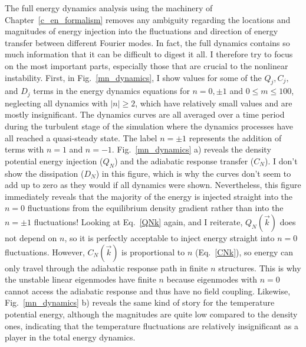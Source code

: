 The full energy dynamics analysis using the machinery of Chapter~\ref{c_en_formalism} removes any ambiguity regarding the locations and magnitudes of energy injection into the fluctuations
and direction of energy transfer between different Fourier modes. In fact, the full dynamics contains so much information that it can be difficult to digest it all. I therefore try to
focus on the most important parts, especially those that are crucial to the nonlinear instability. First, in Fig.~\ref{mn_dynamics}, I show values for some of the $Q_j, C_j,$ and $D_j$
terms in the energy dynamics equations for $n=0, \pm 1$ and $0 \le m \le 100$,
neglecting all dynamics with $|n| \ge 2$, which have relatively small values and are mostly insignificant. The dynamics curves are all averaged over a time period during the
turbulent stage of the simulation where the dynamics processes have all reached a quasi-steady state.
The label $n = \pm 1$ represents the addition of terms with $n=1$ and $n=-1$.
Fig.~\ref{mn_dynamics} a) reveals the density potential energy injection ($Q_N$) and the adiabatic response transfer ($C_N$). I don't show the dissipation ($D_N$) in this figure, which
is why the curves don't seem to add up to zero as they would if all dynamics were shown.
Nevertheless, this figure immediately reveals that the majority of the energy is injected
straight into the $n=0$ fluctuations from the equilibrium density gradient rather than into the $n= \pm 1$ fluctuations! Looking at Eq.~\ref{QNk} again, and I reiterate, $Q_N(\vec{k})$ does not
depend on $n$, so it is perfectly acceptable to inject energy straight into $n=0$ fluctuations. However, $C_N(\vec{k})$ is proportional to $n$ (Eq.~\ref{CNk}), so energy can only travel
through the adiabatic response path in finite $n$ structures. This is why the unstable linear eigenmodes have finite $n$ because eigenmodes with $n=0$ cannot access the adiabatic response and thus
have no field coupling. Likewise, Fig.~\ref{mn_dynamics} b) reveals the same kind of story for the temperature potential energy, although the magnitudes are quite low compared to the density ones,
indicating that the temperature fluctuations are relatively insignificant as a player in the total energy dynamics.

